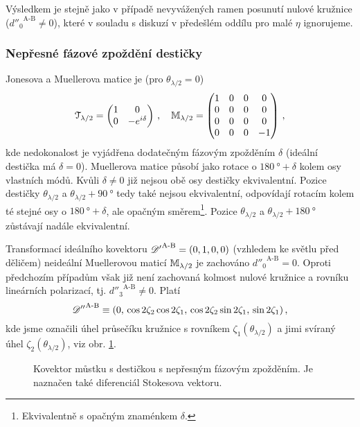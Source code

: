 Výsledkem je stejně jako v případě nevyvážených ramen posunutí nulové kružnice (${d''_0}^\textrm{A-B}\neq0$), které v souladu s diskuzí v předešlém oddílu pro malé $\eta$ ignorujeme.

\subsubsection*{Nepřesné fázové zpoždění destičky}
Jonesova a Muellerova matice je (pro $\theta_{\lambda/2}=0$)
\begin{equation}
    \mathcal{T}_{\lambda/2} = \begin{pmatrix} 1&0 \\ 0&-e^{i\delta} \end{pmatrix} \,, \quad
    \mathbb{M}_{\lambda/2} = \begin{pmatrix} 1&0&0&0 \\ 0&0&0&0 \\ 0&0&0&0 \\ 0&0&0&-1 \end{pmatrix} \,,
\end{equation}
kde nedokonalost je vyjádřena dodatečným fázovým zpožděním $\delta$ (ideální destička má $\delta=0$).
Muellerova matice působí jako rotace o $\SI{180}{\degree}+\delta$ kolem osy vlastních módů.
Kvůli $\delta\neq0$ již nejsou obě osy destičky ekvivalentní.
Pozice destičky $\theta_{\lambda/2}$ a $\theta_{\lambda/2}+\SI{90}{\degree}$ tedy také nejsou ekvivalentní, odpovídají rotacím kolem té stejné osy o $\SI{180}{\degree}+\delta$, ale opačným směrem\footnote{Ekvivalentně s opačným znaménkem $\delta$.}.
Pozice $\theta_{\lambda/2}$ a $\theta_{\lambda/2}+\SI{180}{\degree}$ zůstávají nadále ekvivalentní.

Transformací ideálního kovektoru ${\mathscr{D}'}^\textrm{A-B}=(0, 1, 0, 0)$ (vzhledem ke světlu před děličem) neideální Muellerovou maticí $\mathbb{M}_{\lambda/2}$ je zachováno ${d''_0}^\textrm{A-B}=0$.
Oproti předchozím případům však již není zachovaná kolmost nulové kružnice a rovníku lineárních polarizací, tj. ${d''_3}^\textrm{A-B}\neq0$.
Platí
\begin{equation}
    {\mathscr{D}''}^\textrm{A-B} \equiv (0,\, \cos2\zeta_2\cos2\zeta_1,\, \cos2\zeta_2\sin2\zeta_1,\, \sin2\zeta_1) \,,
\end{equation}
kde jsme označili úhel průsečíku kružnice s rovníkem $\zeta_1(\theta_{\lambda/2})$ a jimi svíraný úhel $\zeta_2(\theta_{\lambda/2})$, viz obr. \ref{fig:mustek-nedokonale-desticka}.

\begin{figure}[htbp]
    \centering
    \caption{Kovektor můstku s destičkou s nepřesným fázovým zpožděním. Je naznačen také diferenciál Stokesova vektoru.}
    \label{fig:mustek-nedokonale-desticka}
\end{figure}

